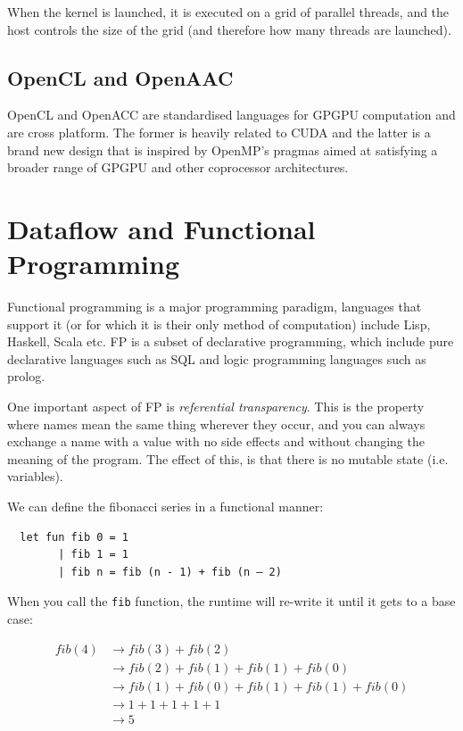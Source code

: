 When the kernel is launched, it is executed on a grid of parallel
threads, and the host controls the size of the grid (and therefore how
many threads are launched).

\subsection{OpenCL and OpenAAC}

OpenCL and OpenACC are standardised languages for GPGPU computation
and are cross platform. The former is heavily related to CUDA and the
latter is a brand new design that is inspired by OpenMP's pragmas
aimed at satisfying a broader range of GPGPU and other coprocessor
architectures.


\section{Dataflow and Functional Programming}

Functional programming is a major programming paradigm, languages that
support it (or for which it is their only method of computation)
include Lisp, Haskell, Scala etc. FP is a subset of declarative
programming, which include pure declarative languages such as SQL and
logic programming languages such as prolog.

One important aspect of FP is \textit{referential transparency}. This
is the property where names mean the same thing wherever they occur,
and you can always exchange a name with a value with no side effects
and without changing the meaning of the program. The effect of this,
is that there is no mutable state (i.e. variables).

We can define the fibonacci series in a functional manner:

\begin{verbatim}
  let fun fib 0 = 1
        | fib 1 = 1
        | fib n = fib (n - 1) + fib (n – 2)
\end{verbatim}

When you call the \texttt{fib} function, the runtime will re-write it
until it gets to a base case:

\[
\begin{split}
  fib(4) &\rightarrow fib(3) + fib(2)\\
         &\rightarrow fib(2) + fib(1) + fib(1) + fib(0)\\
         &\rightarrow fib(1) + fib(0) + fib(1) + fib(1) + fib(0)\\
         &\rightarrow 1 + 1 + 1 + 1 + 1\\
         &\rightarrow 5
\end{split}
\]

